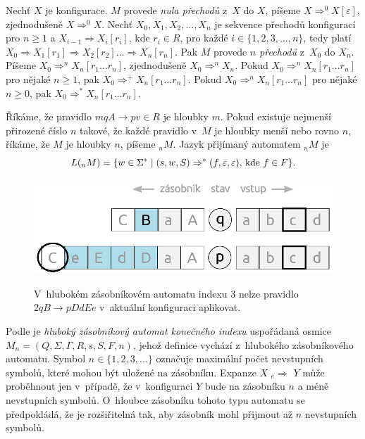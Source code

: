 \begin{Def}
Nechť $X$ je konfigurace. $M$ provede \emph{nula přechodů} z~$X$ do $X$, píšeme $X \Rightarrow^0 X [\varepsilon]$, zjednodušeně $X \Rightarrow^0 X$. Nechť $X_0, X_1, X_2,\dots,X_n $ je sekvence přechodů konfigurací pro $n \ge 1$  a $X_{i-1} \Rightarrow X_i [r_i]$, kde $r_i \in R$, pro každé $i \in \{1, 2, 3,\dots, n\}$, tedy platí $X_0 \Rightarrow X_1 [r_1] \Rightarrow X_2 [r_2] \dots \Rightarrow X_n [r_n]$. Pak $M$ provede \emph{$n$ přechodů} z~$X_0$ do $X_n$. Píšeme $X_{0} \Rightarrow^n X_n [r_1 \dots r_n]$, zjednodušeně $X_{0} \Rightarrow^n X_n$. Pokud $X_{0} \Rightarrow^n X_n [r_1 \dots r_n]$ pro nějaké $n \ge 1$, pak $X_{0} \Rightarrow^+ X_n [r_1 \dots r_n]$. Pokud $X_{0} \Rightarrow^n X_n [r_1 \dots r_n]$ pro nějaké $n \ge 0$, pak $X_{0} \Rightarrow^* X_n [r_1 \dots r_n]$.

Říkáme, že pravidlo $mqA \rightarrow pv \in R$ je hloubky $m$. Pokud existuje nejmenší přirozené číslo $n$ takové, že každé pravidlo v~$M$ je hloubky menší nebo rovno $n$, říkáme, že $M$ je hloubky $n$, píšeme ${}_nM$. Jazyk přijímaný automatem ${}_nM$ je
    $$L({}_nM) = \{ w \in \Sigma^* \mid (s,w,S) \Rightarrow^* (f, \varepsilon, \varepsilon)\textnormal{, kde }f \in F \}.$$


\end{Def}

\begin{figure}[ht]
\centering
\includegraphics{img/bp_pda02.eps} \bigskip \\
\caption{V~hlubokém zásobníkovém automatu indexu 3 nelze pravidlo $2 q B \rightarrow p DdEe$ v~aktuální konfiguraci aplikovat.}
\end{figure}


\begin{Def} Podle \cite{Meduna:FinitelyDeepPDA} je \emph{hluboký zásobníkový automat konečného indexu} uspořádaná osmice $M_n = (Q,\Sigma,\Gamma, R, s, S, F, n)$, jehož definice vychází z~hlubokého zásobníkového automatu. Symbol $n \in \{1,2,3,\dots\}$ označuje maximální počet nevstupních symbolů, které mohou být uložené na zásobníku. Expanze $X$  ${}_e{\Rightarrow}$  $Y$ může proběhnout jen v~případě, že v~konfiguraci $Y$ bude na zásobníku $n$ a méně nevstupních symbolů.  O~hloubce zásobníku tohoto typu automatu se předpokládá, že je rozšiřitelná tak, aby zásobník mohl přijmout až $n$ nevstupních symbolů.


\end{Def}

